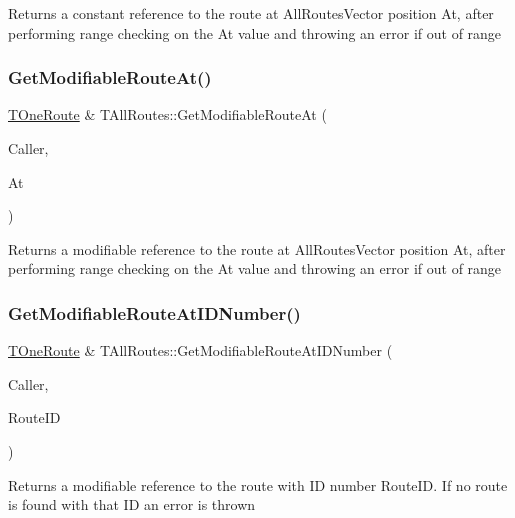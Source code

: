 Returns a constant reference to the route at All\+Routes\+Vector position \textquotesingle{}At\textquotesingle{}, after performing range checking on the \textquotesingle{}At\textquotesingle{} value and throwing an error if out of range \mbox{\label{class_t_all_routes_a8b522eb0d7aa415c3648d464c2885484}} 
\subsubsection{\texorpdfstring{Get\+Modifiable\+Route\+At()}{GetModifiableRouteAt()}}
{\footnotesize\ttfamily \mbox{\hyperlink{class_t_one_route}{T\+One\+Route}} \& T\+All\+Routes\+::\+Get\+Modifiable\+Route\+At (\begin{DoxyParamCaption}\item[{int}]{Caller,  }\item[{int}]{At }\end{DoxyParamCaption})}

Returns a modifiable reference to the route at All\+Routes\+Vector position \textquotesingle{}At\textquotesingle{}, after performing range checking on the \textquotesingle{}At\textquotesingle{} value and throwing an error if out of range \mbox{\label{class_t_all_routes_a22bbb69a96356c26848fe9c6b154f387}} 
\subsubsection{\texorpdfstring{Get\+Modifiable\+Route\+At\+I\+D\+Number()}{GetModifiableRouteAtIDNumber()}}
{\footnotesize\ttfamily \mbox{\hyperlink{class_t_one_route}{T\+One\+Route}} \& T\+All\+Routes\+::\+Get\+Modifiable\+Route\+At\+I\+D\+Number (\begin{DoxyParamCaption}\item[{int}]{Caller,  }\item[{\mbox{\hyperlink{class_i_d_int}{I\+D\+Int}}}]{Route\+ID }\end{DoxyParamCaption})}

Returns a modifiable reference to the route with ID number Route\+ID. If no route is found with that ID an error is thrown \mbox{\label{class_t_all_routes_a7eda7a4b535c7538e217bbbc4d878071}} 
